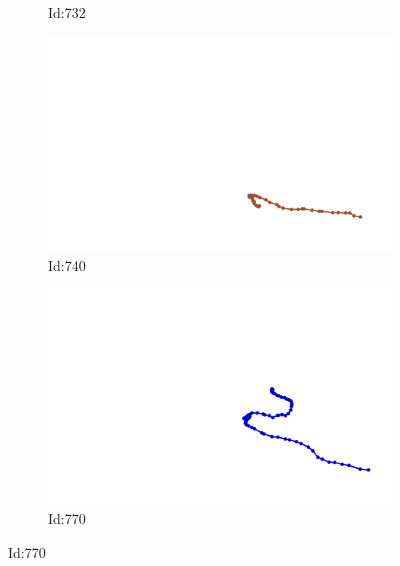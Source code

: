 \documentclass[12pt,twoside]{report}
\begin{document}
\begin{figure}
\begin{subfigure}[b]{0.20\textwidth}
\caption{Id:732}
\end{subfigure}
\begin{subfigure}[b]{0.20\textwidth}
\centering
\includegraphics[width=\textwidth]{../trajectories/740.png}
\caption{Id:740}
\end{subfigure}
\begin{subfigure}[b]{0.20\textwidth}
\centering
\includegraphics[width=\textwidth]{../trajectories/770.png}
\caption{Id:770}
\end{subfigure}
\end{figure}
\end{document}
